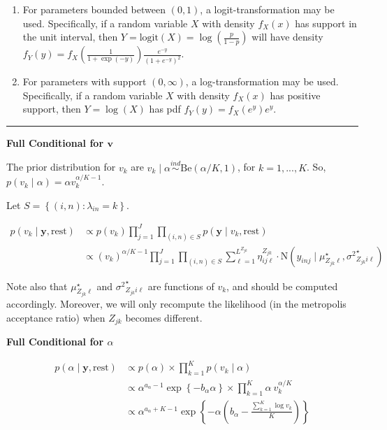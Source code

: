 \documentclass[12pt,]{article}
\providecommand{\tightlist}{%
  \setlength{\itemsep}{0pt}\setlength{\parskip}{0pt}}
\newcommand{\p}[1]{\left(#1\right)}
\newcommand{\bc}[1]{ \left\{#1\right\} }
\newcommand{\N}{ \mathcal{N} }
\newcommand{\ind}{\overset{ind}{\sim}}
\def\logit{\text{logit}}
\def\N{\text{N}}
\def\Be{\text{Be}}
\def\lin{\lambda_{in}}
\def\y{\bm{y}}
\def\mus{\mu^\star}
\def\sss{{\sigma^2}^\star}
\def\rest{\text{rest}}
\begin{document}
\begin{enumerate}
\def\labelenumi{\arabic{enumi}.}
\tightlist
\item
  For parameters bounded between \((0,1)\), a logit-transformation may
  be used. Specifically, if a random variable \(X\) with density
  \(f_X(x)\) has support in the unit interval, then
  \(Y=\logit(X)=\log\p{\frac{p}{1-p}}\) will have density
  \(f_Y(y) = f_X\p{\frac{1}{1+\exp(-y)}}\frac{e^{-y}}{(1+e^{-y})^{2}}\).
\item
  For parameters with support \((0,\infty)\), a log-transformation may
  be used. Specifically, if a random variable \(X\) with density
  \(f_X(x)\) has positive support, then \(Y = \log(X)\) has pdf
  \(f_Y(y) = f_X(e^y) e^y\).
\end{enumerate}



\vspace{5em}
\hrule
\vspace{5em}

\textbf{Full Conditional for $\bm v$}

The prior distribution for \(v_k\) are
\(v_k \mid \alpha \ind \Be(\alpha/K, 1)\), for \(k = 1,...,K\). So,
\(p(v_k \mid \alpha) = \alpha v_k^{\alpha/K-1}\).

Let \(S = \bc{(i,n)\colon \lin = k}\).

\begin{align*}
p(v_k \mid \y, \rest) &\propto p(v_k) \prod_{j=1}^J\prod_{(i,n)\in S} p(\y \mid
  v_k, \rest) \\
&\propto (v_k)^{\alpha/K-1} \prod_{j=1}^J \prod_{(i,n)\in S}
\sum_{\ell=1}^{L^{Z_{jk}}} \eta^{Z_{jk}}_{ij\ell} \cdot
\N(y_{inj} \mid \mus_{Z_{jk}\ell}, \sss_{Z_{jk}i\ell})
\end{align*}


Note also that \(\mus_{Z_{jk}\ell}\) and \(\sss_{Z_{jk}i\ell}\) are
functions of \(v_k\), and should be computed accordingly. Moreover, we
will only recompute the likelihood (in the metropolis acceptance ratio)
when \(Z_{jk}\) becomes different.
\vspace{2em}


\textbf{Full Conditional for $\alpha$}

\begin{align*}
p(\alpha \mid \y, \rest) &\propto p(\alpha) \times \prod_{k=1}^K p(v_k \mid
  \alpha) \\
&\propto \alpha^{a_\alpha - 1} \exp\bc{-b_\alpha \alpha} \times \prod_{k=1}^K 
\alpha~v_k^{\alpha/K} \\
&\propto \alpha^{a_\alpha + K -1} \exp\bc{-\alpha\p{b_\alpha - 
\frac{\sum_{k=1}^K \log v_k}{K}}}
\end{align*}
\end{document}
